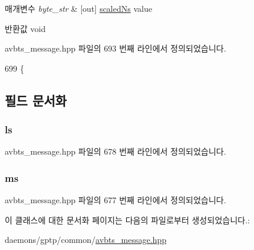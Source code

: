 \begin{DoxyParams}{매개변수}
{\em byte\+\_\+str} & \mbox{[}out\mbox{]} \hyperlink{classscaled_ns}{scaled\+Ns} value \\
\hline
\end{DoxyParams}
\begin{DoxyReturn}{반환값}
void 
\end{DoxyReturn}


avbts\+\_\+message.\+hpp 파일의 693 번째 라인에서 정의되었습니다.


\begin{DoxyCode}
699     \{
\end{DoxyCode}


\subsection{필드 문서화}
\subsubsection[{\texorpdfstring{ls}{ls}}]{ ls\hspace{0.3cm}{\ttfamily [private]}}\hypertarget{classscaled_ns_a700a3d499d075f959691271b70cb18eb}{}\label{classscaled_ns_a700a3d499d075f959691271b70cb18eb}


avbts\+\_\+message.\+hpp 파일의 678 번째 라인에서 정의되었습니다.

\subsubsection[{\texorpdfstring{ms}{ms}}]{ ms\hspace{0.3cm}{\ttfamily [private]}}\hypertarget{classscaled_ns_a578044f719d8aa5d03b6946020e666f6}{}\label{classscaled_ns_a578044f719d8aa5d03b6946020e666f6}


avbts\+\_\+message.\+hpp 파일의 677 번째 라인에서 정의되었습니다.



이 클래스에 대한 문서화 페이지는 다음의 파일로부터 생성되었습니다.\+:\begin{DoxyCompactItemize}
\item 
daemons/gptp/common/\hyperlink{avbts__message_8hpp}{avbts\+\_\+message.\+hpp}\end{DoxyCompactItemize}
